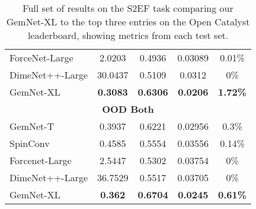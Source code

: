 \documentclass{article} \usepackage{iclr2022_conference,times}
\newcommand{\mc}[3]{\multicolumn{#1}{#2}{#3}}
\begin{document}
\begin{table*}[htb]
\begin{tabular}{l|cccc}
        ForceNet-Large & 2.0203	& 0.4936 & 0.03089 & 0.01\% \\
        DimeNet++-Large & 30.0437	& 0.5109	& 0.0312 & 0\% \\
        GemNet-XL & \textbf{0.3083} & \textbf{0.6306} & \textbf{0.0206} & \textbf{1.72\%} \\
        \midrule
        \mc{5}{c}{\textbf{OOD Both}} \\
        GemNet-T & 0.3937 & 0.6221 & 0.02956 & 0.3\% \\
        SpinConv & 0.4585 & 0.5554 & 0.03556 & 0.14\% \\
        Forcenet-Large &	2.5447	& 0.5302 & 0.03754 & 0\% \\
        DimeNet++-Large & 36.7529 & 0.5517 & 0.03705 & 0\% \\
        GemNet-XL & \textbf{0.362} & \textbf{0.6704} & \textbf{0.0245} & \textbf{0.61\%} \\
        \bottomrule
    \end{tabular}
\caption{Full set of results on the S2EF task comparing our GemNet-XL to the top three entries on the Open Catalyst leaderboard, showing metrics from each test set. }
    \label{tab:s2ef_results_full}
\end{table*}
\end{document}
